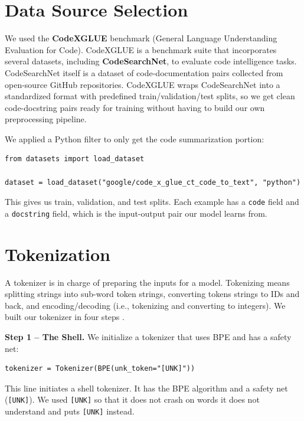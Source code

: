 \documentclass[11pt]{article}
\begin{document}
\section{Data Source Selection}

We used the \textbf{CodeXGLUE} \cite{codexglue} benchmark (General Language Understanding Evaluation for Code). CodeXGLUE is a benchmark suite that incorporates several datasets, including \textbf{CodeSearchNet}, to evaluate code intelligence tasks. CodeSearchNet itself is a dataset of code-documentation pairs collected from open-source GitHub repositories. CodeXGLUE wraps CodeSearchNet into a standardized format with predefined train/validation/test splits, so we get clean code-docstring pairs ready for training without having to build our own preprocessing pipeline.

We applied a Python filter to only get the code summarization portion:

\begin{lstlisting}[style=python]
from datasets import load_dataset

dataset = load_dataset("google/code_x_glue_ct_code_to_text", "python")
\end{lstlisting}

This gives us train, validation, and test splits. Each example has a \texttt{code} field and a \texttt{docstring} field, which is the input-output pair our model learns from.

\section{Tokenization}

A tokenizer is in charge of preparing the inputs for a model. Tokenizing means splitting strings into sub-word token strings, converting tokens strings to IDs and back, and encoding/decoding (i.e., tokenizing and converting to integers). We built our tokenizer in four steps \cite{karpathy_tokenizer, hf_tokenizer}.

\textbf{Step 1 -- The Shell.} We initialize a tokenizer that uses BPE and has a safety net:

\begin{lstlisting}[style=python]
tokenizer = Tokenizer(BPE(unk_token="[UNK]"))
\end{lstlisting}

This line initiates a shell tokenizer. It has the BPE algorithm and a safety net (\texttt{[UNK]}). We used \texttt{[UNK]} so that it does not crash on words it does not understand and puts \texttt{[UNK]} instead.
\end{document}
